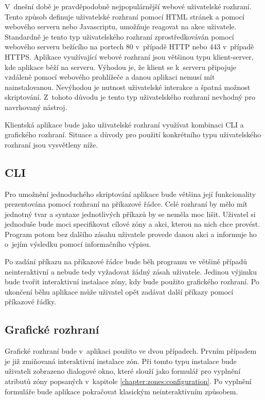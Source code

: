 V~dnešní době je pravděpodobně nejpopulárnější webové uživatelské rozhraní. Tento způsob definuje uživatelské rozhraní pomocí
HTML stránek a pomocí webového serveru nebo Javascriptu, umožňuje reagovat na akce uživatele. Standardně je tento typ uživatelského
rozhraní zprostředkováván pomocí webového serveru bežícího na portech 80 v~případě HTTP nebo 443 v~případě HTTPS. Aplikace
využívající webové rozhraní jsou většinou typu klient-server, kde aplikace běží na serveru. Výhodou je, že klient se
k~serveru připojuje vzdáleně pomocí webového prohlížeče a danou aplikaci nemusí mít nainstalovanou. Nevýhodou je nutnost
uživatelské interakce a špatná možnost skriptování. Z~tohoto důvodu je tento typ uživatelského rozhraní nevhodný pro navrhovaný
nástroj.

Klientská aplikace bude jako uživatelské rozhraní využívat kombinaci CLI a grafického rozhraní. Situace a důvody pro použití
konkrétního typu uživatelského rozhraní jsou vysvětleny níže.
\subsection{CLI}
\label{chapter:design:ui:cli}
Pro umožnění jednoduchého skriptování aplikace bude většina její funkcionality prezentována pomocí rozhraní na příkazové
řádce. Celé rozhraní by mělo mít jednotný tvar a syntaxe jednotlivých příkazů by se neměla moc lišit. Uživatel si jednoduše
bude moci specifikovat cílové zóny a akci, kterou na nich chce provést. Program potom bez dalšího zásahu uživatele provede
danou akci a informuje ho o~jejím výsledku pomocí informačního výpisu.

Po zadání příkazu na příkazové řádce bude běh programu ve většině případů neinteraktivní a nebude tedy vyžadovat žádný 
zásah uživatele. Jedinou výjimku bude tvořit interaktivní instalace zóny, kdy bude použito grafického rozhraní. Po ukončení
běhu aplikace může uživatel opět zadávat další příkazy pomocí příkazové řádky.
\subsection{Grafické rozhraní}
\label{chapter:design:ui:gui}
Grafické rozhraní bude v~aplikaci použito ve dvou případech. Prvním případem je již zmiňovaná interaktivní instalace zón. Při
tomto typu instalace bude uživateli zobrazeno dialogové okno, které slouží jako formulář pro vyplnění atributů zóny popsaných
v~kapitole \ref{chapter:zones:configuration}. Po vyplnění formuláře bude aplikace pokračovat klasickým neinteraktivním způsobem.

